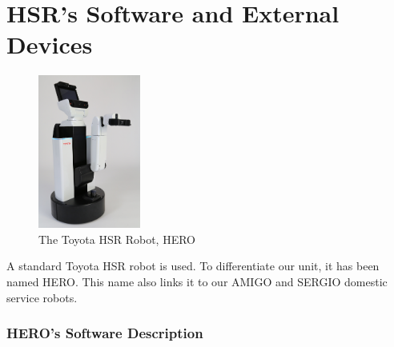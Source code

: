 \section{HSR's Software and External Devices}

\setlength\intextsep{0pt}
\begin{figure}
	\centering
	\includegraphics[width=0.3\textwidth]{Figures/Toyota_HSR}
	\caption{The Toyota\texttrademark\hspace{0em} HSR Robot, HERO}
	\label{fig:hsr}
\end{figure}

A standard Toyota\texttrademark\hspace{0em} HSR robot is used. To differentiate our unit, it has been named HERO. This name also links it to our AMIGO and SERGIO domestic service robots.

\subsubsection{HERO's Software Description}

